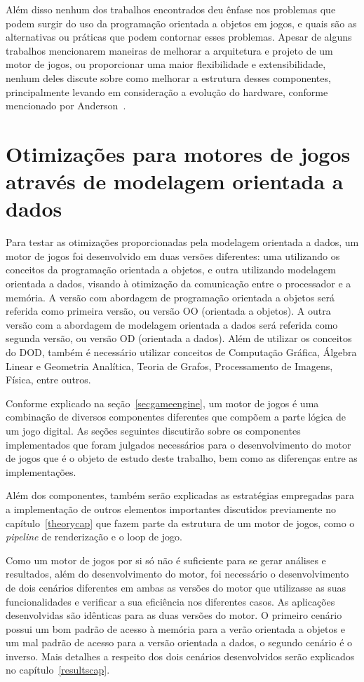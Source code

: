 Além disso nenhum dos trabalhos encontrados deu ênfase nos problemas que podem surgir 
do uso da programação orientada a objetos em jogos, e quais são as alternativas ou 
práticas que podem contornar esses problemas. Apesar de alguns trabalhos mencionarem 
maneiras de melhorar a arquitetura e projeto de um motor de jogos, ou proporcionar 
uma maior flexibilidade e extensibilidade, nenhum deles discute sobre como melhorar a 
estrutura desses componentes, principalmente levando em consideração a evolução do 
hardware, conforme mencionado por Anderson~\cite{Anderson2008}.

\chapter{Otimizações para motores de jogos através de modelagem 
orientada a dados}
\label{proposalcap}

Para testar as otimizações proporcionadas pela modelagem orientada 
a dados, um motor de jogos foi desenvolvido em duas versões 
diferentes: uma utilizando os conceitos da programação orientada a 
objetos, e outra utilizando modelagem orientada a dados,
visando à otimização da comunicação entre o processador e a memória.
A versão com abordagem de programação orientada a objetos será 
referida como primeira versão, ou versão OO (orientada a objetos). A 
outra versão com a abordagem de modelagem orientada a dados será referida 
como segunda versão, ou versão OD (orientada a dados).
Além de utilizar os conceitos do DOD, também é necessário 
utilizar conceitos de Computação Gráfica, Álgebra Linear e Geometria Analítica, Teoria 
de Grafos, Processamento de Imagens, Física, entre outros.

Conforme explicado na seção~\ref{secgameengine}, um motor de jogos é uma combinação de 
diversos componentes diferentes que compõem a parte lógica de um jogo digital. As 
seções seguintes discutirão sobre os componentes implementados que foram julgados 
necessários para o desenvolvimento do motor de jogos que é o objeto de estudo deste 
trabalho, bem como as diferenças entre as implementações.

Além dos componentes, também serão explicadas as estratégias empregadas para a 
implementação de outros elementos importantes discutidos previamente no 
capítulo~\ref{theorycap} que fazem parte da estrutura de um motor de jogos, como o 
\textit{pipeline} de renderização e o loop de jogo.

Como um motor de jogos por si só não é suficiente para se gerar análises e resultados,
além do desenvolvimento do motor, foi necessário o desenvolvimento de dois cenários 
diferentes em ambas as versões do motor que utilizasse as suas funcionalidades e 
verificar a sua eficiência nos diferentes casos. As aplicações desenvolvidas 
são idênticas para as duas versões do motor. O primeiro cenário possui um bom padrão 
de acesso à memória para a verão orientada a objetos e um mal padrão de acesso para a 
versão orientada a dados, o segundo cenário é o inverso. Mais detalhes a respeito dos 
dois cenários desenvolvidos serão explicados no capítulo~\ref{resultscap}.

